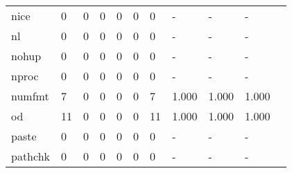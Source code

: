 \begin{longtable}{lp{1.10cm}p{1.10cm}p{1.10cm}p{1.10cm}p{1.10cm}p{1.10cm}p{1.10cm}p{1.10cm}p{1.10cm}p{1.10cm}}
nice      &                      0 &                                  0 &                                 0 &                                0 &                                 0 &                               0 &                              - &                                     - &                                   - \\
nl        &                      0 &                                  0 &                                 0 &                                0 &                                 0 &                               0 &                              - &                                     - &                                   - \\
nohup     &                      0 &                                  0 &                                 0 &                                0 &                                 0 &                               0 &                              - &                                     - &                                   - \\
nproc     &                      0 &                                  0 &                                 0 &                                0 &                                 0 &                               0 &                              - &                                     - &                                   - \\
numfmt    &                      7 &                                  0 &                                 0 &                                0 &                                 0 &                               7 &                          1.000 &                                 1.000 &                               1.000 \\
od        &                     11 &                                  0 &                                 0 &                                0 &                                 0 &                              11 &                          1.000 &                                 1.000 &                               1.000 \\
paste     &                      0 &                                  0 &                                 0 &                                0 &                                 0 &                               0 &                              - &                                     - &                                   - \\
pathchk   &                      0 &                                  0 &                                 0 &                                0 &                                 0 &                               0 &                              - &                                     - &                                   - \\

\end{longtable}
